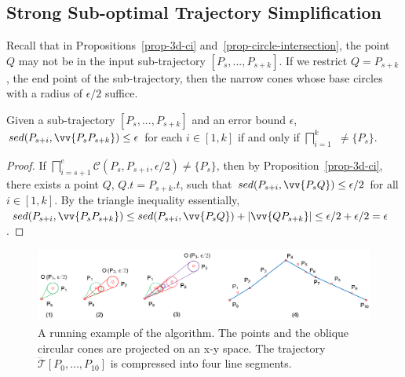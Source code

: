 \subsection{Strong Sub-optimal Trajectory Simplification}
Recall that in Propositions~\ref{prop-3d-ci} and~\ref{prop-circle-intersection}, the point $Q$ may not be in the input sub-trajectory $[P_s,...,P_{s+k}]$.
If we restrict $Q=P_{s+k}$, the end point of the sub-trajectory, then the narrow cones whose base circles with a radius of $\epsilon/2$ suffice.

\begin{prop}
\label{prop-3d-ci-half}
Given a sub-trajectory $[P_s,...,P_{s+k}]$ and an error bound $\epsilon$, $sed(P_{s+i}, \vv{P_sP_{s+k}})\le \epsilon$ for each $i \in [1,k]$ if and only if $\bigsqcap_{i=1}^{k}$ $\ne \{P_s\}$.
\end{prop}


\begin{proof}
If $\bigsqcap_{i=s+1}^{e}{\mathcal{C}(P_s, P_{s+i}, \epsilon/2)} \ne \{P_s\}$, then by Proposition~\ref{prop-3d-ci}, there exists a point $Q$, $Q.t = P_{s+k}.t$, such that $sed(P_{s+i}, \vv{P_sQ})\le \epsilon/2$ for all $i \in [1,k]$. By the triangle inequality essentially, $sed(P_{s+i}, \vv{P_sP_{s+k}})\le  sed(P_{s+i}, \vv{P_sQ}) + |\vv{QP_{s+k}}| \le  \epsilon/2+\epsilon/2 = \epsilon$.
\end{proof}



\begin{figure}[tb!]
	\centering
	\includegraphics[scale=0.8]{figures/Fig-ex-conest.png}
	\caption{\small A running example of the \cist algorithm. The points and the oblique circular cones are projected on an x-y space. The trajectory $\dddot{\mathcal{T}}[P_0, \ldots, P_{10}]$ is compressed into four line segments.}
	\vspace{-1ex}
	\label{fig:exm-const}
\end{figure}

